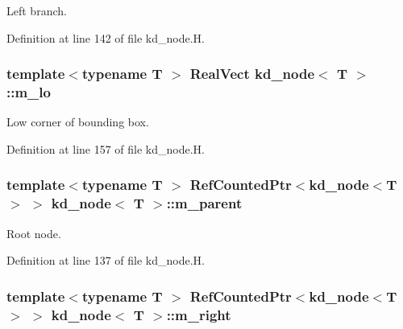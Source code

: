 Left branch. 



Definition at line 142 of file kd\+\_\+node.\+H.

\subsubsection[{\texorpdfstring{m\+\_\+lo}{m_lo}}]{\setlength{\rightskip}{0pt plus 5cm}template$<$typename T $>$ Real\+Vect {\bf kd\+\_\+node}$<$ T $>$\+::m\+\_\+lo\hspace{0.3cm}{\ttfamily [protected]}}\hypertarget{classkd__node_a8218b763208b296d1d74117bbac74a64}{}\label{classkd__node_a8218b763208b296d1d74117bbac74a64}


Low corner of bounding box. 



Definition at line 157 of file kd\+\_\+node.\+H.

\subsubsection[{\texorpdfstring{m\+\_\+parent}{m_parent}}]{\setlength{\rightskip}{0pt plus 5cm}template$<$typename T $>$ Ref\+Counted\+Ptr$<${\bf kd\+\_\+node}$<$T$>$ $>$ {\bf kd\+\_\+node}$<$ T $>$\+::m\+\_\+parent\hspace{0.3cm}{\ttfamily [protected]}}\hypertarget{classkd__node_a2e506cc45509a5238060430ccf0f24ca}{}\label{classkd__node_a2e506cc45509a5238060430ccf0f24ca}


Root node. 



Definition at line 137 of file kd\+\_\+node.\+H.

\subsubsection[{\texorpdfstring{m\+\_\+right}{m_right}}]{\setlength{\rightskip}{0pt plus 5cm}template$<$typename T $>$ Ref\+Counted\+Ptr$<${\bf kd\+\_\+node}$<$T$>$ $>$ {\bf kd\+\_\+node}$<$ T $>$\+::m\+\_\+right\hspace{0.3cm}{\ttfamily [protected]}}\hypertarget{classkd__node_a5aec903a3bbfc430b1a801e05d8f5b6c}{}\label{classkd__node_a5aec903a3bbfc430b1a801e05d8f5b6c}


